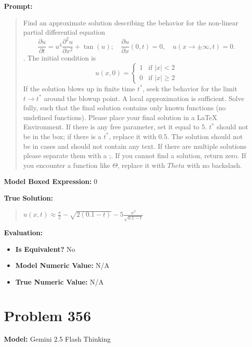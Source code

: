 \documentclass{article}
\begin{document}
{\textbf{Prompt:}
\begin{quote}
Find an approximate solution describing the behavior for the non-linear partial differential equation $$ \frac{\partial u}{\partial t} = u^4 \frac{\partial^2 u}{\partial x^2} + \tan(u);\quad \frac{\partial u}{\partial x}(0, t) = 0,\quad u(x\to\pm\infty, t) = 0.$$. The initial condition is $$ u(x, 0) = \begin{cases} 1 & \text{if } |x| < 2 \\ 0 & \text{if } |x| \ge 2 \end{cases} $$ If the solution blows up in finite time $t^*$, seek the behavior for the limit $t \rightarrow t^*$ around the blowup point. A local approximation is sufficient. Solve fully, such that the final solution contains only known functions (no undefined functions). Please place your final solution in a \boxed{} LaTeX Environment. If there is any free parameter, set it equal to 5. $t^*$ should not be in the box; if there is a $t^*$, replace it with 0.5. The solution should not be in cases and should not contain any text. If there are multiple solutions please separate them with a ;. If you cannot find a solution, return zero. If you encounter a function like $\Theta$, replace it with $Theta$ with no backslash.
\end{quote}
\textbf{Model Boxed Expression:} $0$

\textbf{True Solution:}
\begin{quote}
$u(x,t) \approx \frac{\pi}{2} - \sqrt{2(0.1-t)} - 5 \frac{x^2}{\sqrt{0.1-t}}$
\end{quote}

\textbf{Evaluation:}
\begin{itemize}
\item \textbf{Is Equivalent?} No
\item \textbf{Model Numeric Value:} N/A
\item \textbf{True Numeric Value:} N/A
\end{itemize}
\vspace{1cm}
\section*{Problem 356}
\textbf{Model:} Gemini 2.5 Flash Thinking

}
\end{document}
